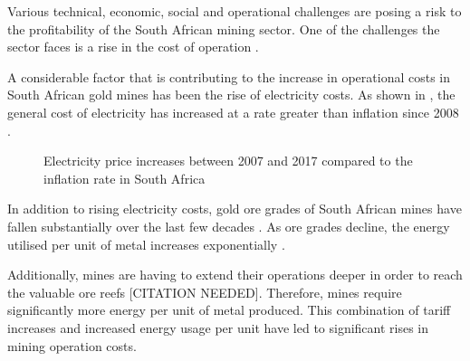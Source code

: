 	 	Various technical, economic, social and operational challenges are posing a risk to the profitability of the South African mining sector. One of the challenges the sector faces is a rise in the cost of operation \cite{neingo2016trends}.
	 	\par
		A considerable factor that is contributing to the increase in operational costs in South African gold mines has been the rise of electricity costs. As shown in , the general cost of electricity has increased at a rate greater than inflation since 2008 \cite{Eskom2013Tariffs}.
		\begin{figure}[h]
			\centering
			\fbox{}
			\caption[Electricity price increases between 2007 and 2017 compared to the inflation rate in South Africa]{Electricity price increases between 2007 and 2017 \cite{Eskom2013Tariffs} compared to the inflation rate in South Africa\protect\footnotemark[1]}
			\label{fig: Eskom tariffs}
		\end{figure}
	\clearpage
		\par
		In addition to rising electricity costs, gold ore grades of South African mines have fallen substantially over the last few decades \cite{mudd2007global}. As ore grades decline, the energy utilised per unit of metal increases exponentially \cite{muller2010numerical}. 
		\par
		Additionally, mines are having to extend their operations deeper in order to reach the valuable ore reefs [CITATION NEEDED]. Therefore, mines require significantly more energy per unit of metal produced. This combination of tariff increases and increased energy usage per unit have led to significant rises in mining operation costs.
